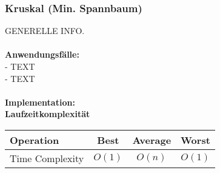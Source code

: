 \documentclass[../main.tex]{subfiles}
\begin{document}
	\subsubsection{Kruskal (Min. Spannbaum)}
	GENERELLE INFO. \\\\
	\textbf{Anwendungsfälle:}\\
	- TEXT\\
	- TEXT\\\\
	\textbf{Implementation:}\\
	 
	\textbf{Laufzeitkomplexität}\\
	\begin{table}[ht]
		\centering
		\begin{tabular}{l *{3}{c}}
			\toprule
			Operation & Best & Average & Worst\\
			\midrule
			Time Complexity & $O(1)$ & $O(n)$ & $O(1)$\\
			\bottomrule
		\end{tabular}
	\end{table}
	\clearpage
\end{document}
